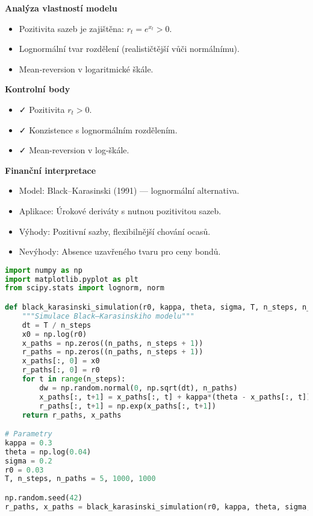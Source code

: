 \begin{example}
\noindent\textbf{Analýza vlastností modelu}
\begin{itemize}
\item Pozitivita sazeb je zajištěna: $r_t = e^{x_t} > 0$.
\item Lognormální tvar rozdělení (realističtější vůči normálnímu).
\item Mean-reversion v logaritmické škále.
\end{itemize}

\noindent\textbf{Kontrolní body}
\begin{itemize}
\item ✓ Pozitivita $r_t>0$.
\item ✓ Konzistence s lognormálním rozdělením.
\item ✓ Mean-reversion v log-škále.
\end{itemize}

\noindent\textbf{Finanční interpretace}
\begin{itemize}
\item Model: Black–Karasinski (1991) — lognormální alternativa.
\item Aplikace: Úrokové deriváty s nutnou pozitivitou sazeb.
\item Výhody: Pozitivní sazby, flexibilnější chování ocasů.
\item Nevýhody: Absence uzavřeného tvaru pro ceny bondů.
\end{itemize}

\begin{lstlisting}[language=Python, caption={Implementace Black–Karasinski modelu v Pythonu}]
import numpy as np
import matplotlib.pyplot as plt
from scipy.stats import lognorm, norm

def black_karasinski_simulation(r0, kappa, theta, sigma, T, n_steps, n_paths):
    """Simulace Black–Karasinskiho modelu"""
    dt = T / n_steps
    x0 = np.log(r0)
    x_paths = np.zeros((n_paths, n_steps + 1))
    r_paths = np.zeros((n_paths, n_steps + 1))
    x_paths[:, 0] = x0
    r_paths[:, 0] = r0
    for t in range(n_steps):
        dw = np.random.normal(0, np.sqrt(dt), n_paths)
        x_paths[:, t+1] = x_paths[:, t] + kappa*(theta - x_paths[:, t]) * dt + sigma * dw
        r_paths[:, t+1] = np.exp(x_paths[:, t+1])
    return r_paths, x_paths

# Parametry
kappa = 0.3
theta = np.log(0.04)
sigma = 0.2
r0 = 0.03
T, n_steps, n_paths = 5, 1000, 1000

np.random.seed(42)
r_paths, x_paths = black_karasinski_simulation(r0, kappa, theta, sigma, T, n_steps, n_paths)


\end{lstlisting}
\end{example}
